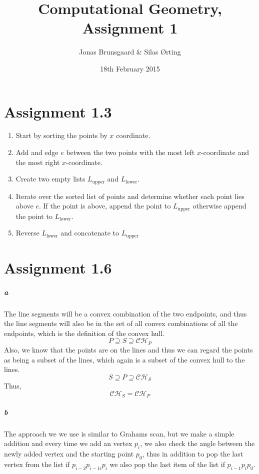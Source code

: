 \documentclass[10pt,a4paper,final,oneside,openany,article]{memoir}
\title{Computational Geometry, Assignment 1}
\author{
    Jonas Brunsgaard \& Silas Ørting
}
\date{18th February 2015}
\begin{document}
\maketitle

\chapter*{Assignment 1.3}
\begin{enumerate}
  \item Start by sorting the points by $x$ coordinate.
  \item Add and edge $e$ between the two points with the most left
    $x$-coordinate and the most right $x$-coordinate.
  \item Create two empty lists $L_{\textrm{upper}}$ and $L_{\textrm{lower}}$.
  \item Iterate over the sorted list of points and determine whether each point
    lies above $e$. If the point is above, append the point to
    $L_{\textrm{upper}}$ otherwise append the point to $L_{\textrm{lower}}$.
  \item Reverse $L_{\textrm{lower}}$ and concatenate to $L_{\textrm{upper}}$
\end{enumerate}

\chapter*{Assignment 1.6}
\paragraph{a} The line segments will be a convex combination of the two
endpoints, and thus the line segments will also be in the set of all convex
combinations of all the endpoints, which is the definition of the convex hull.
$$ P \supseteq S \supseteq \mathcal{CH}_P $$
Also, we know that the points are on the lines and thus we can regard the
points as being a subset of the lines, which again is a subset of the convex
hull to the lines.
$$ S \supseteq P \supseteq \mathcal{CH}_S $$
Thus,
$$ \mathcal{CH}_S = \mathcal{CH}_P $$
\paragraph{b} The approach we we use is similar to Grahams scan, but we make
a simple addition and every time we add an vertex $p_{i}$, we also check the
angle between the newly added vertex and the starting point $p_0$, thus in
addition to pop the last vertex from the list if $p_{i-2}p_{i-1i}p_{i}$ we
also pop the last item of the list if $p_{i-1}p_{i}p_{0}$.
\end{document}
